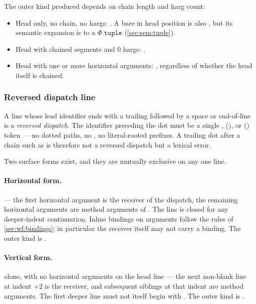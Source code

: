 The outer kind produced depends on chain length and harg count:
\begin{itemize}
  \item Head only, no chain, no hargs: .
    A bare \ff{*} in head position is also , but its semantic
    expansion is to a \(\Phi.\mathtt{tuple}\)
    (\cref{sec:sem:tuple}).
  \item Head with chained  segments and 0 hargs: .
  \item Head with one or more horizontal arguments: ,
    regardless of whether the head itself is chained.
\end{itemize}

\subsubsection{Reversed dispatch line}\label{sec:syntax:reversed}

A line whose lead identifier ends with a trailing  followed by a space
  or end-of-line is a \emph{reversed dispatch}.
The identifier preceding the dot must be a single , 
  (), or  (\ff{\textasciicircum}) token ---
  no dotted paths, no , no literal-rooted prefixes.
A trailing dot after a chain such as  is therefore not a
  reversed dispatch but a lexical error.

Two surface forms exist, and they are mutually exclusive on any one line.

\paragraph{Horizontal form.}
 ---
  the first horizontal argument is the receiver of the dispatch,
  the remaining horizontal arguments are method arguments of .
The line is closed for any deeper-indent continuation.
Inline bindings on arguments follow the rules of \cref{sec:wf:bindings};
  in particular the receiver itself may not carry a binding.
The outer kind is .

\paragraph{Vertical form.}
 alone, with no horizontal arguments on the head line ---
  the next non-blank line at indent \(+2\) is the receiver,
  and subsequent siblings at that indent are method arguments.
The first deeper line must not itself begin with .
The outer kind is .

